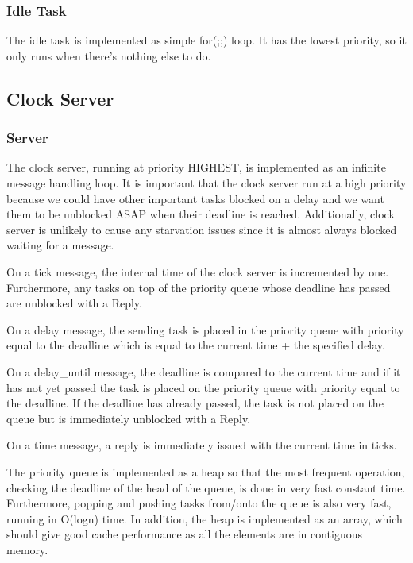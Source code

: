 \documentclass{article}
\begin{document}
\subsubsection{Idle Task}

The idle task is implemented as simple for(;;) loop. It has the lowest priority, so it only runs when there's nothing else to do.

\subsection{Clock Server}

\subsubsection{Server}
The clock server, running at priority HIGHEST, is implemented as an infinite message handling loop. It is important that the clock server run at a high priority because we could have other important tasks blocked on a delay and we want them to be unblocked ASAP when their deadline is reached. Additionally, clock server is unlikely to cause any starvation issues since it is almost always blocked waiting for a message.

On a tick message, the internal time of the clock server is incremented by one. Furthermore, any tasks on top of the priority queue whose deadline has passed are unblocked with a Reply.

On a delay message, the sending task is placed in the priority queue with priority equal to the deadline which is equal to the current time + the specified delay.

On a delay\_until message, the deadline is compared to the current time and if it has not yet passed the task is placed on the priority queue with priority equal to the deadline. If the deadline has already passed, the task is not placed on the queue but is immediately unblocked with a Reply.

On a time message, a reply is immediately issued with the current time in ticks.

The priority queue is implemented as a heap so that the most frequent operation, checking the deadline of the head of the queue, is done in very fast constant time. Furthermore, popping and pushing tasks from/onto the queue is also very fast, running in O(logn) time. In addition, the heap is implemented as an array, which should give good cache performance as all the elements are in contiguous memory.
\end{document}
